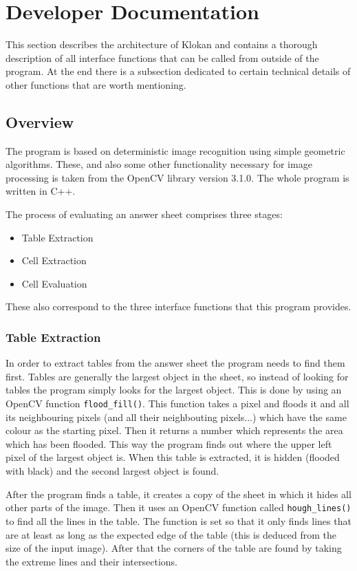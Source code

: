\documentclass{article}
\begin{document}
\section{Developer Documentation}{
This section describes the architecture of Klokan and contains a thorough description of all interface functions that can be called from outside of the program. At the end there is a subsection dedicated to certain technical details of other functions that are worth mentioning.
	\subsection{Overview}{
	The program is based on deterministic image recognition using simple geometric algorithms. These, and also some other functionality necessary for image processing is taken from the OpenCV library version 3.1.0. The whole program is written in C++.

	The process of evaluating an answer sheet comprises three stages:
	\begin{itemize}
		\item Table Extraction
		\item Cell Extraction
		\item Cell Evaluation
	\end{itemize}

	These also correspond to the three interface functions that this program provides.

		\subsubsection{Table Extraction}{
		In order to extract tables from the answer sheet the program needs to find them first. Tables are generally the largest object in the sheet, so instead of looking for tables the program simply looks for the largest object. This is done by using an OpenCV function \verb+flood_fill()+. This function takes a pixel and floods it and all its neighbouring pixels (and all their neighbouting pixels...) which have the same colour as the starting pixel. Then it returns a number which represents the area which has been flooded. This way the program finds out where the upper left pixel of the largest object is. When this table is extracted, it is hidden (flooded with black) and the second largest object is found.

		After the program finds a table, it creates a copy of the sheet in which it hides all other parts of the image. Then it uses an OpenCV function called \verb+hough_lines()+ to find all the lines in the table. The function is set so that it only finds lines that are at least as long as the expected edge of the table (this is deduced from the size of the input image). After that the corners of the table are found by taking the extreme lines and their intersections.

}}}
\end{document}
